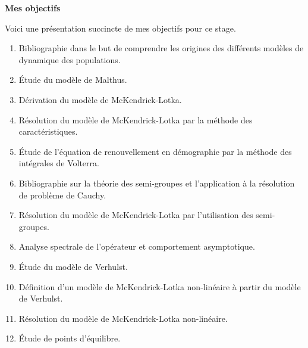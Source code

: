
\thispagestyle{empty}
\vspace*{1cm}

\begin{center}
    \Large\textbf{Mes objectifs}
\end{center}

Voici une présentation succincte de mes objectifs pour ce stage.

\begin{enumerate}
    \item Bibliographie dans le but de comprendre les origines des différents modèles de dynamique des populations.
    \item \'Etude du modèle de Malthus.
    \item Dérivation du modèle de McKendrick-Lotka.
    \item Résolution du modèle de McKendrick-Lotka par la méthode des caractéristiques.
    \item \'Etude de l'équation de renouvellement en démographie par la méthode des intégrales de Volterra.
    \item Bibliographie sur la théorie des semi-groupes et l'application à la résolution de problème de Cauchy.
    \item Résolution du modèle de McKendrick-Lotka par l'utilisation des semi-groupes.
    \item Analyse spectrale de l'opérateur et comportement asymptotique.
    \item \'Etude du modèle de Verhulst.
    \item Définition d'un modèle de McKendrick-Lotka non-linéaire à partir du modèle de Verhulst.
    \item Résolution du modèle de McKendrick-Lotka non-linéaire.
    \item \'Etude de points d'équilibre.
\end{enumerate}